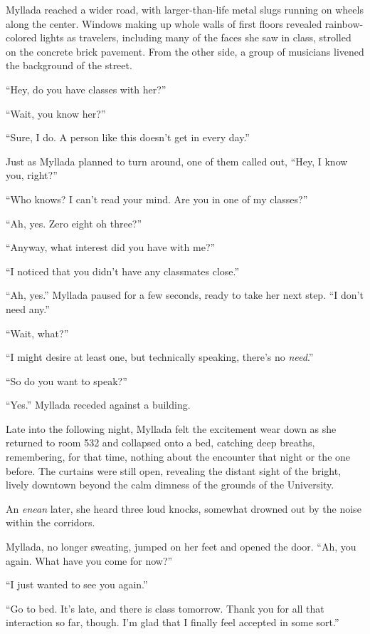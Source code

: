 Myllada reached a wider road, with larger-than-life metal slugs running on wheels along the center. Windows making up whole walls of first floors revealed rainbow-colored lights as travelers, including many of the faces she saw in class, strolled on the concrete brick pavement. From the other side, a group of musicians livened the background of the street.

``Hey, do you have classes with her?''

``Wait, you know her?''

``Sure, I do. A person like this doesn't get in every day.''

Just as Myllada planned to turn around, one of them called out, ``Hey, I know you, right?''

``Who knows? I can't read your mind. Are you in one of my classes?''

``Ah, yes. Zero eight oh three?''

``Anyway, what interest did you have with me?''

``I noticed that you didn't have any classmates close.''

``Ah, yes.'' Myllada paused for a few seconds, ready to take her next step. ``I don't need any.''

``Wait, what?''

``I might desire at least one, but technically speaking, there's no \emph{need}.''

``So do you want to speak?''

``Yes.'' Myllada receded against a building.

\centeredstars

Late into the following night, Myllada felt the excitement wear down as she returned to room 532 and collapsed onto a bed, catching deep breaths, remembering, for that time, nothing about the encounter that night or the one before. The curtains were still open, revealing the distant sight of the bright, lively downtown beyond the calm dimness of the grounds of the University.

An \emph{enean} later, she heard three loud knocks, somewhat drowned out by the noise within the corridors.

Myllada, no longer sweating, jumped on her feet and opened the door. ``Ah, you again. What have you come for now?''

``I just wanted to see you again.''

``Go to bed. It's late, and there is class tomorrow. Thank you for all that interaction so far, though. I'm glad that I finally feel accepted in some sort.''

